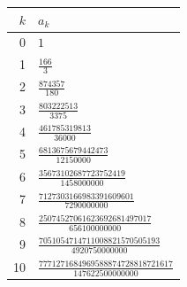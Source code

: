 \begin{tabular}{r@{\qquad}l}
\toprule
$k$ & $a_k$ \\
\midrule
0 & $1$ \\[1.2ex]
1 & $\frac{166}{3}$ \\[1.2ex]
2 & $\frac{874357}{180}$ \\[1.2ex]
3 & $\frac{803222513}{3375}$ \\[1.2ex]
4 & $\frac{461785319813}{36000}$ \\[1.2ex]
5 & $\frac{6813675679442473}{12150000}$ \\[1.2ex]
6 & $\frac{35673102687723752419}{1458000000}$ \\[1.2ex]
7 & $\frac{7127303166983391609601}{7290000000}$ \\[1.2ex]
8 & $\frac{25074527061623692681497017}{656100000000}$ \\[1.2ex]
9 & $\frac{7051054714711008821570505193}{4920750000000}$ \\[1.2ex]
10 & $\frac{7771271684969588874728818721617}{147622500000000}$ \\[1.2ex]
\bottomrule
\end{tabular}
